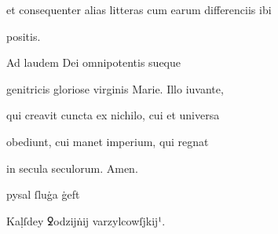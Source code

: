 et consequenter alias litteras cum earum differenciis ibi 

positis.	

Ad laudem Dei omnipotentis sueque 

genitricis gloriose virginis Marie. Illo iuvante,

qui creavit cuncta ex nichilo, cui et universa 

obediunt, cui manet imperium, qui regnat 

in secula seculorum. Amen.

pysal ſluġa ġeft

Kaḷſdey ꝿodzĳṅĳ varzylcowſjkĳ¹. 






\endinput




















\catcode `\^^M=5

  \newtip{48}{Łoś niesłusznie uważa, że \textit{bika} w obu wypadkach
    napisano błędnie zamiast \textit{ƀyka}. Przykłady są bowiem podane
    w~pisowni dotychczasowej dla pokazania jej niewystarczalności do
    zróżnicowania wyrazów \textit{bika} i \textit{byka}.} 

\obeylines






\newcommand{\margin}[1]{\annotatetextBlue{\{#1\}}{zapisy na marginesie}}



\renewcommand{\over}[1]{\annotatetextBlue{\{#1\}}{zapisy nad rządkami}}

\newcommand{\add}[1]{\annotatetextOlive{<#1>}{litery i wyrazy dodane, (których w tekście brak)}}

